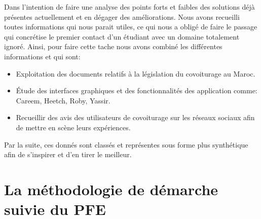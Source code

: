 Dans l'intention de faire une analyse des points forts et faibles des solutions déjà présentes actuellement et en dégager des améliorations. Nous avons recueilli toutes informations qui nous parait utiles, ce qui nous a obligé de faire le passage qui concrétise le premier contact d'un étudiant avec un domaine totalement ignoré.\newline
Ainsi, pour faire cette tache nous avons combiné les différentes informations et qui sont: 
\begin{itemize}
	\item Exploitation des documents relatifs à la législation du covoiturage au Maroc.
	\item Étude des interfaces graphiques et des fonctionnalités des application comme: Careem, Heetch, Roby, Yassir.
	\item Recueillir des avis des utilisateurs de covoiturage sur les réseaux sociaux afin de mettre en scène leurs expériences.
\end{itemize}
Par la suite, ces donnés sont classés et représentes sous forme plus synthétique afin de s'inspirer et d'en tirer le meilleur.

\section{La méthodologie de démarche suivie du PFE}


